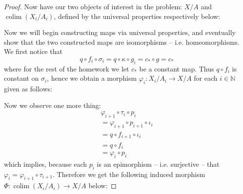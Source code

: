 \documentclass{article}
\newcommand{\N}{\mathbb{N}}
\DeclareMathOperator{\colim}{\mathrm{colim}}
\begin{document}
\begin{proof}
    
    Now have our two objects of interest in the problem: $X/A$ and $\colim (X_i/A_i)$, defined by the universal properties respectively below:
    \begin{center}
    \end{center}
    \begin{center}
    \end{center}
    Now we will begin constructing maps via universal properties, and eventually show that the two constructed maps are isomorphisms -- i.e. homeomorphisms. We first notice that 
    \[
    q\circ f_i \circ \sigma_i=q\circ \kappa \circ g_i=c_*\circ g=c_*
    \]
    where for the rest of the homework we let $c_*$ be a constant map. Thus $q\circ f_i$ is constant on $\sigma_i$, hence we obtain a morphism $\varphi_i:X_i/A_i \to X/A$ for each $i\in \N$ given as follows:
    \begin{center}
    \end{center}
    Now we observe one more thing:
    \begin{align*}
        \varphi_{i+1}\circ \tau_i\circ p_i\\
        =\varphi_{i+1}\circ p_{i+1}\circ \iota_i\\
        =q\circ f_{i+1}\circ \iota_i\\
        =q\circ f_i\\
        =\varphi_i\circ p_i
    \end{align*}
    which implies, because each $p_i$ is an epimorphism -- i.e. surjective -- that $\varphi_i=\varphi_{i+1}\circ \tau_{i+1}$. Therefore we get the following induced morphism $\Phi:\colim (X_i/A_i)\to X/A$ below:

\end{proof}
\end{document}
